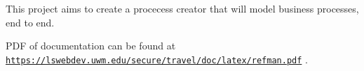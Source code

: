 This project aims to create a procecess creator that will model business processes, end to end.

P\-D\-F of documentation can be found at \href{https://lswebdev.uwm.edu/secure/travel/doc/latex/refman.pdf}{\tt https\-://lswebdev.\-uwm.\-edu/secure/travel/doc/latex/refman.\-pdf} . 